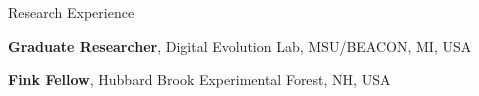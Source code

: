 \begin{rubric}{Research Experience}


%
\entry*[2013 -- Present] \textbf{Graduate Researcher}, Digital Evolution Lab, MSU/BEACON, MI, USA
\ifshort
\else
{}

\fi
%
\entry*[Summer 2013] \textbf{Fink Fellow}, Hubbard Brook Experimental Forest, NH, USA
\ifshort
\else
{}

\fi

%

\end{rubric}